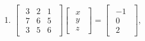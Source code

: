 \documentclass{article}
\begin{document}
\begin{enumerate}
\begin{enumerate}
            \item $\begin{bmatrix}\begin{array}{rrr} 3 & 2 & 1\\ 7 & 6 & 5\\ 3 & 5 & 6 \end{array}\end{bmatrix} \begin{bmatrix}\begin{array}{r} x\\ y\\ z \end{array}\end{bmatrix} = \begin{bmatrix}\begin{array}{r} -1\\ 0\\ 2 \end{array}\end{bmatrix}$,



\end{enumerate}
\end{enumerate}
\end{document}
